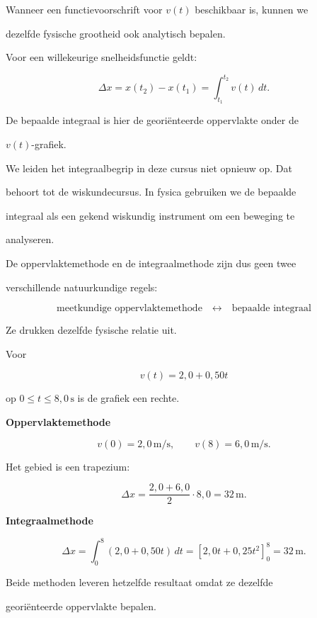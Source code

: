 \documentclass{ximera}
\begin{document}

Wanneer een functievoorschrift voor $v(t)$ beschikbaar is, kunnen we

dezelfde fysische grootheid ook analytisch bepalen.

\begin{eigenschap}

Voor een willekeurige snelheidsfunctie geldt:

\[\boxed{ \Delta x = x(t_2)-x(t_1) = \int_{t_1}^{t_2}v(t)\,dt. }\]

De bepaalde integraal is hier de georiënteerde oppervlakte onder de

$v(t)$-grafiek.

\end{eigenschap}

We leiden het integraalbegrip in deze cursus niet opnieuw op. Dat

behoort tot de wiskundecursus. In fysica gebruiken we de bepaalde

integraal als een gekend wiskundig instrument om een beweging te

analyseren.

De oppervlaktemethode en de integraalmethode zijn dus geen twee

verschillende natuurkundige regels:

\[\boxed{ \text{meetkundige oppervlaktemethode} \quad\longleftrightarrow\quad \text{bepaalde integraal} }\]

Ze drukken dezelfde fysische relatie uit.

\begin{voorbeeld}

Voor

\[v(t)=2,0+0,50t\]

op $0\leq t\leq8,0\,\mathrm{s}$ is de grafiek een rechte.

\textbf{Oppervlaktemethode}

\[v(0)=2,0\,\mathrm{m/s}, \qquad v(8)=6,0\,\mathrm{m/s}.\]

Het gebied is een trapezium:

\[\Delta x = \frac{2,0+6,0}{2}\cdot8,0 = 32\,\mathrm{m}.\]

\textbf{Integraalmethode}

\[\Delta x = \int_0^8(2,0+0,50t)\,dt = \left[2,0t+0,25t^2\right]_0^8 = 32\,\mathrm{m}.\]

Beide methoden leveren hetzelfde resultaat omdat ze dezelfde

georiënteerde oppervlakte bepalen.

\end{voorbeeld}
\end{document}
